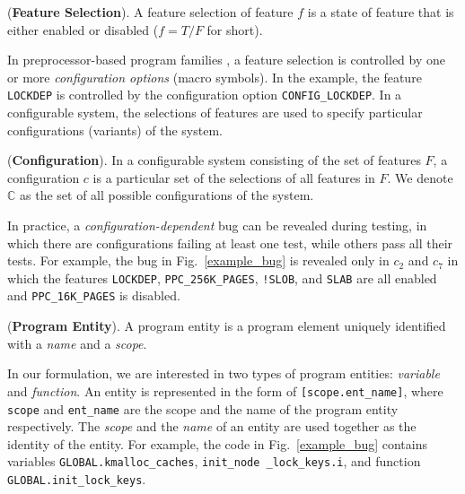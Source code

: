 \begin{Definition}{({\bf Feature Selection}).}
A feature selection of feature $f$ is a state of feature that is 
either enabled or disabled ($f=T/F$ for short).
\end{Definition}
%
In preprocessor-based program families \cite{kastner2012virtual}, a 
feature selection is controlled by one or more \textit{configuration 
options} (macro symbols). In the example, the feature \texttt{LOCKDEP} 
is controlled by the configuration option \texttt{CONFIG\_LOCKDEP}.
%
In a configurable system, the selections of features are used to specify
particular configurations (variants) of the system.
%
\begin{Definition}{({\bf Configuration}).}
In a configurable system consisting of the set of features $F$, a 
configuration $c$ is a particular set of the selections of all 
features in $F$. We denote $\mathbb{C}$ as the set of all possible 
configurations of the system.
\end{Definition}
%
In practice, a {\em configuration-dependent} bug can be revealed
during testing, in which there are configurations failing at least
one test, while others pass all their tests.
For example, the bug in Fig.~\ref{example_bug} is revealed only in
$c_2$ and $c_7$ in which the features \texttt{LOCKDEP},
\texttt{PPC\_256K\_PAGES}, \texttt{!SLOB}, and \texttt{SLAB} are all
enabled and \texttt{PPC\_16K\_PAGES} is disabled.

\begin{Definition}{({\bf Program Entity}).}
A program entity is a program element uniquely identified with
a \textit{name} and a \textit{scope}.
\end{Definition}

In our formulation, we are interested in two types of program
entities: {\em variable} and {\em function}.
%
An entity is represented in the form of \texttt{[scope.ent\_name]},
where \texttt{scope} and \texttt{ent\_name} are the scope and the 
name of the program entity respectively. The \textit{scope} and the
\textit{name} of an entity are used together as the identity of the
entity. For example, the code in Fig.~\ref{example_bug} contains
variables \texttt{GLOBAL.kmalloc\_caches}, \texttt{init\_node
\_lock\_keys.i}, and function \texttt{GLOBAL.init\_lock\_keys}.
%

